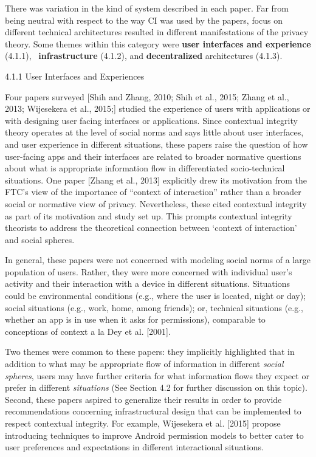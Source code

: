 \documentclass[../thesis.tex]{subfiles}
\begin{document}
\textcolor[rgb]{0.2,0.2,0.2}{There was variation in the kind of system
described in each paper. Far from being neutral with respect to the way
CI was used by the papers, focus on different technical architectures
resulted in different manifestations of the privacy theory. }Some
themes within this category were \textbf{user interfaces and experience
}(4.1.1), \ \textbf{infrastructure }(4.1.2), and \textbf{decentralized}
architectures (4.1.3).

{\color[rgb]{0.4,0.4,0.4}
4.1.1 User Interfaces and Experiences}


\bigskip

Four papers surveyed [\textcolor[rgb]{0.2,0.2,0.2}{Shih and }Zhang,
20\textcolor[rgb]{0.2,0.2,0.2}{10; Shih et al., 2015; Z}hang et al.,
20\textcolor[rgb]{0.2,0.2,0.2}{13; W}ijesekera et al.,
20\textcolor[rgb]{0.2,0.2,0.2}{15;}] studied the experience of users
with applications or with designing user facing interfaces or
applications. Since contextual integrity theory operates at the level
of social norms and says little about user interfaces, and user
experience in different situations, these papers raise the question of
how user-facing apps and their interfaces are related to broader
normative questions about what is appropriate information flow in
differentiated socio-technical situations. One paper
\textcolor[rgb]{0.2,0.2,0.2}{[Z}hang et al.,
20\textcolor[rgb]{0.2,0.2,0.2}{13] }explicitly drew its motivation from
the FTC's view of the importance of
``context of interaction'' rather
than a broader social or normative view of privacy. Nevertheless, these
cited contextual integrity as part of its motivation and study set up.
This prompts contextual integrity theorists to address the theoretical
connection between {\textquoteleft}context of
interaction' and social spheres.

In general, these papers were not concerned with modeling social norms
of a large population of users. Rather, they were more concerned with
individual user's activity and their interaction with a
device in different situations. Situations could be environmental
conditions (e.g., where the user is located, night or day); social
situations (e.g., work, home, among friends); or, technical situations
(e.g., whether an app is in use when it asks for permissions),
comparable to conceptions of context a la Dey et al. [2001].

Two themes were common to these papers: they implicitly highlighted that
in addition to what may be appropriate flow of information in different
\textit{social spheres}, users may have further criteria for what
information flows they expect or prefer in different
\textit{situations} (See Section 4.2 for further discussion on this
topic). Second, these papers aspired to generalize their results in
order to provide recommendations concerning infrastructural design that
can be implemented to respect contextual integrity. For example,
\textcolor[rgb]{0.2,0.2,0.2}{Wijesekera et al. [20}15] propose
introducing techniques to improve Android permission models to better
cater to user preferences and expectations in different interactional
situations.
\end{document}
